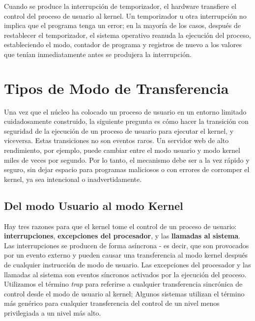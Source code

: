 \documentclass[10pt]{book}
\begin{document}
Cuando se produce la interrupción de temporizador, el hardware transfiere el control del proceso de usuario al kernel. Un temporizador u otra interrupción no implica que el programa tenga un error; en la mayoría de los casos, después de restablecer el temporizador, el sistema operativo reanuda la ejecución del proceso, estableciendo el modo, contador de programa y registros de nuevo a los valores que tenían inmediatamente antes se produjera la interrupción.

\section{Tipos de Modo de Transferencia}

Una vez que el núcleo ha colocado un proceso de usuario en un entorno limitado cuidadosamente construido, la siguiente pregunta es cómo hacer la transición con seguridad de la ejecución de un proceso de usuario para ejecutar el kernel, y viceversa. Estas transiciones no son eventos raros. Un servidor web de alto rendimiento, por ejemplo, puede cambiar entre el modo usuario y modo kernel miles de veces por segundo. Por lo tanto, el mecanismo debe ser a la vez rápido y seguro, sin dejar espacio para programas maliciosos o con errores de corromper el kernel, ya sea intencional o inadvertidamente.

\subsection{Del modo Usuario al modo Kernel}

Hay tres razones para que el kernel tome el control de un proceso de usuario: \textbf{interrupciones}, \textbf{excepciones del procesador}, y las \textbf{llamadas al sistema}. Las interrupciones se producen de forma asíncrona - es decir, que son provocados por un evento externo y pueden causar una transferencia al modo kernel después de cualquier instrucción de modo de usuario. Las excepciones del procesador y las llamadas al sistema son eventos síncronos activados por la ejecución del proceso. Utilizamos el término \textit{trap} para referirse a cualquier transferencia sincrónica de control desde el modo de usuario al kernel; Algunos sistemas utilizan el término más genérico para cualquier transferencia del control de un nivel menos privilegiada a un nivel más alto.
\end{document}
